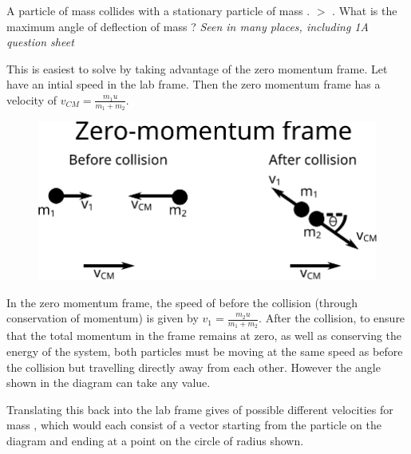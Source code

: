 
\begin{problem}   %
{A particle of mass  collides with a stationary particle of mass .  $>$ . What is the maximum angle of deflection of mass ?} %
{\textit{Seen in many places, including 1A question sheet}} %
{This is easiest to solve by taking advantage of the zero momentum frame. Let  have an intial speed  in the lab frame. Then the zero momentum frame has a velocity of $v_{CM} = \frac{m_{1}u}{m_{1} + m_{2}}$.

\begin{figure}[h]
\centering
\includegraphics[width=1.0\textwidth]{../../../figures/dynamics_zero_momentum_frame_deflection.svg}
\caption{}\label{fig:dynamics_zero_momentum_frame_deflection}
\end{figure}


In the zero momentum frame, the speed of  before the collision (through conservation of momentum) is given by $v_1 = \frac{m_{2}u}{m_{1} + m_{2}}$. After the collision, to ensure that the total momentum in the frame remains at zero, as well as conserving the energy of the system, both particles must be moving at the same speed as before the collision but travelling directly away from each other. However the angle \vari{\theta} shown in the diagram can take any value.


Translating this back into the lab frame gives of possible different velocities for mass  , which would each consist of a vector starting from the particle on the diagram and ending at a point on the circle of radius  shown.

}
\end{problem}
